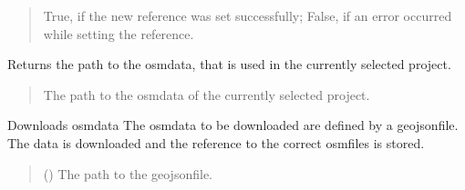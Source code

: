 \documentclass[letterpaper,10pt,english]{sphinxmanual}
\begin{document}
\begin{fulllineitems}
\begin{fulllineitems}
\begin{quote}
\begin{description}
\sphinxAtStartPar
True, if the new reference was set successfully; False, if an error occurred while setting the reference.

\sphinxAtStartPar
{}

\end{description}\end{quote}

\end{fulllineitems}


\begin{fulllineitems}
\label{\detokenize{apidoc/src.osm_configurator.control:src.osm_configurator.control.control_interface.IControl.get_osm_data_reference}}
\pysigstartsignatures
{}
\pysigstopsignatures
\sphinxAtStartPar
Returns the path to the osm\sphinxhyphen{}data, that is used in the currently selected project.
\begin{quote}\begin{description}
\sphinxAtStartPar
The path to the osm\sphinxhyphen{}data of the currently selected project.

\sphinxAtStartPar
{}

\end{description}\end{quote}

\end{fulllineitems}


\begin{fulllineitems}
\label{\detokenize{apidoc/src.osm_configurator.control:src.osm_configurator.control.control_interface.IControl.download_osm_data}}
\pysigstartsignatures
{}
\pysigstopsignatures
\sphinxAtStartPar
Downloads osm\sphinxhyphen{}data
The osm\sphinxhyphen{}data to be downloaded are defined by a geojson\sphinxhyphen{}file. The data is downloaded and the reference to the correct osm\sphinxhyphen{}files is stored.
\begin{quote}\begin{description}
\sphinxAtStartPar
{} () \textendash{} The path to the geojson\sphinxhyphen{}file.


\end{description}
\end{quote}
\end{fulllineitems}
\end{fulllineitems}
\end{document}
